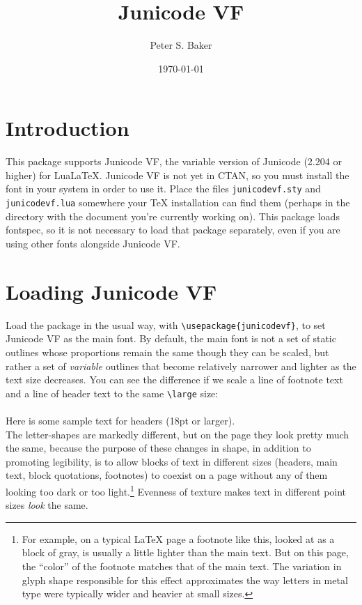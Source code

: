 \documentclass[12pt]{article}
\title{Junicode VF}
\author{Peter S. Baker}
\date{\today}
\newcommand{\lltech}{Lua\LaTeX}
\newcommand{\fspec}{{\sffamily fontspec}}
\begin{document}
\maketitle

\section{Introduction}

This package supports Junicode VF, the variable version of Junicode
(2.204 or higher) for \lltech. Junicode VF is not yet in CTAN, so you must
install the font in your system in order to use it. Place the files
\texttt{junicodevf.sty} and \texttt{junicodevf.lua} somewhere your {\TeX} 
installation can find them (perhaps in the directory with the document
you're currently working on). This package loads
\fspec, so it is not necessary to load that package separately, even if you are using
other fonts alongside Junicode VF.

\section{Loading Junicode VF}

Load the package in the usual way, with {\verb|\usepackage{junicodevf}|}, to
set Junicode VF as the main font.
By default, the main font is not a set of static outlines whose proportions
remain the same though they can be scaled, but rather a set of
\emph{variable} outlines that become relatively narrower and lighter as the
text size decreases. You can see the difference if we scale a line of footnote
text and a line of header text to the same {\verb|\large|} size:\\[0.5ex]

\\[0.2ex]
{\large\sampleheader Here is some sample text for headers (18pt or larger).}\\[0.5ex]

\noindent The letter-shapes are markedly different, but on the page they look
pretty much the same, because the purpose of these changes in
shape, in addition to promoting legibility,
is to allow blocks of text in different sizes (headers, main text,
block quotations, footnotes) to coexist on a page without any of them looking too
dark or too light.\footnote{%
For example, on a typical LaTeX page a footnote like this, looked at as a block
of gray, is usually a little lighter than the main text. But on this page, the
“color” of the footnote matches that of the main text. The variation in glyph
shape responsible for this effect approximates the way letters in metal type were
typically wider and heavier at small sizes.} Evenness of texture makes text in
different point sizes \emph{look} the same.
\end{document}
